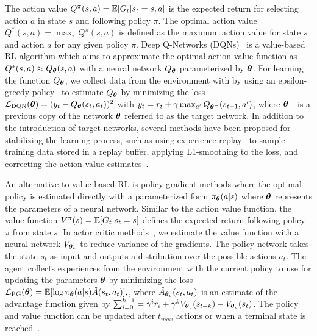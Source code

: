 The action value $Q^{\pi}(s, a) = \mathbb{E}[G_t | s_t=s, a]$  is the expected return for selecting action $a$ in state $s$ and following policy $\pi$. The optimal action value $Q^{*}(s, a) = \max_{\pi} Q^{\pi}(s, a)$ is defined as the maximum action value for state $s$ and action $a$ for any given policy $\pi$. Deep Q-Networks (DQNs)~ is a value-based RL algorithm which aims to approximate the optimal action value function as $Q^{*}(s, a) \approx Q_{{\bm{\theta}}}(s, a)$ with a neural network $Q_{{\bm{\theta}}}$ parameterized by ${\bm{\theta}}$. For learning the function $Q_{{\bm{\theta}}}$, we collect data from the environment with by using an epsilon-greedy policy~ to estimate $Q_{{\bm{\theta}}}$ by minimizing the loss ${\mathcal{L}}_{\text{DQN}}({\bm{\theta}}) = (y_t - Q_{{\bm{\theta}}}(s_t, a_t))^2$ with $y_t = r_t + \gamma \max_{a'} Q_{{\bm{\theta}}^{-}}(s_{t+1}, a')$, where ${\bm{\theta}}^{-}$ is a previous copy of the network ${\bm{\theta}}$ referred to as the target network. In addition to the introduction of target networks, several methods have been proposed for stabilizing the learning process, such as using experience replay~ to sample training data stored in a replay buffer, applying L1-smoothing to the loss, and correcting the action value estimates~. 

An alternative to value-based RL is policy gradient methods where the optimal policy is estimated directly with a parameterized form $\pi_{{\bm{\theta}}}(a | s)$ where ${\bm{\theta}}$ represents the parameters of a neural network. 
Similar to the action value function, the value function $V^{\pi}(s) = \mathbb{E}[G_t | s_t=s]$ defines the expected return following policy $\pi$ from state $s$. In actor critic methods~, we estimate the value function with a neural network $V_{{\bm{\theta}}_v}$ to reduce variance of the gradients. 
The policy network takes the state $s_t$ as input and outputs a distribution over the possible actions $a_t$. The agent collects experiences from the environment with the current policy to use for updating the parameters ${\bm{\theta}}$ by minimizing the loss ${\mathcal{L}}_{\text{PG}}({\bm{\theta}}) = \mathbb{E}[\log \pi_{{\bm{\theta}}}(a | s) \hat{A}(s_t, a_t)],$, where $\hat{A}_{{\bm{\theta}}_v}(s_t, a_t)$ is an estimate of the advantage function given by $\sum_{i=0}^{k-1} = \gamma^{i} r_i + \gamma^{k} V_{{\bm{\theta}}_v}(s_{t+k}) - V_{{\bm{\theta}}_v}(s_{t})$. The policy and value function can be updated after $t_{max}$ actions or when a terminal state is reached~.
